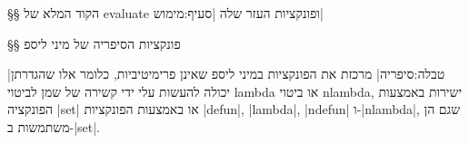 \eject
§§ הקוד המלא של evaluate ופונקציות העזר שלה
|סעיף:מימוש|

\immediate\closeout {}

\begin{LTR}
  
\end{LTR}

\eject
§§ פונקציות הסיפריה של מיני ליספ

|טבלה:סיפריה| מרכזת את הפונקציות במיני ליספ שאינן פרימיטיביות, כלומר אלו
שהגדרתן יכולה להעשות עלי ידי קשירה של שמן לביטוי lambda או ביטוי nlambda,
ישירות באמצעות הפונקציה \E|set| או באמצעות הפונקציות \E|defun|, \E|lambda|,
\E|ndefun| ו-\E|nlambda|, שגם הן משתמשות ב-\E|set|.

